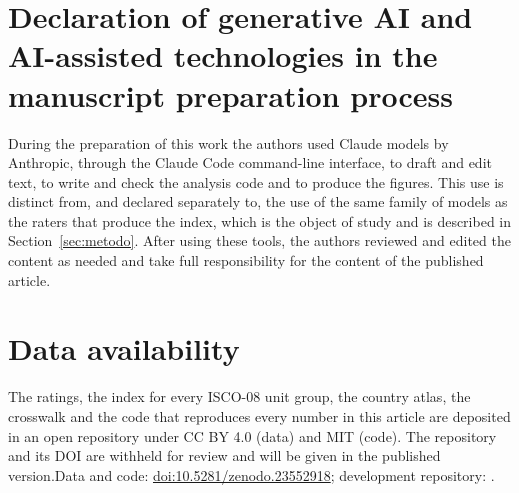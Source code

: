 \section*{Declaration of generative AI and AI-assisted technologies in the manuscript preparation process}
During the preparation of this work the authors used Claude models by Anthropic, through the Claude Code command-line interface, to draft and edit text, to write and check the analysis code and to produce the figures. This use is distinct from, and declared separately to, the use of the same family of models as the raters that produce the index, which is the object of study and is described in Section~\ref{sec:metodo}. After using these tools, the authors reviewed and edited the content as needed and take full responsibility for the content of the published article.

\section*{Data availability}
The ratings, the index for every ISCO-08 unit group, the country atlas, the crosswalk and the code that reproduces every number in this article are deposited in an open repository under CC BY 4.0 (data) and MIT (code). \ifanonimo The repository and its DOI are withheld for review and will be given in the published version.\else Data and code: \href{https://doi.org/10.5281/zenodo.23552918}{doi:10.5281/zenodo.23552918}; development repository: \repourl.\fi
